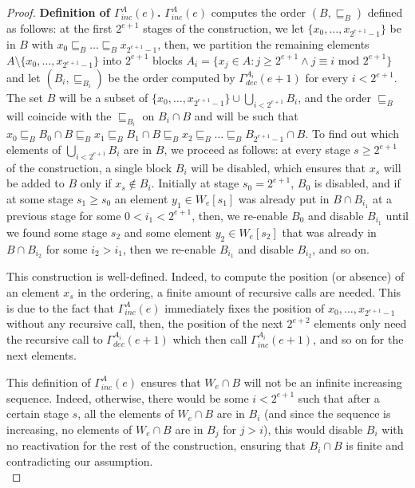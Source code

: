 \documentclass{article}
\numberwithin{theorem}{section}
\begin{document}
\begin{proof}
\textbf{Definition of $\Gamma^A_{inc}(e)$.}
$\Gamma^A_{inc}(e)$ computes the order $(B, \sqsubseteq_B)$ defined as follows: at the first $2^{e+1}$ stages of the construction, we let $\{x_0, \dots, x_{2^{e+1}-1}\}$ be in $B$ with $x_0 \sqsubseteq_B \dots \sqsubseteq_B x_{2^{e+1} - 1}$, then, we partition the remaining elements $A \setminus \{x_0, \dots, x_{2^{e+1} - 1}\}$ into $2^{e+1}$ blocks $A_i = \{x_j \in A : j \geq 2^{e+1} \wedge j \equiv i \mbox{ mod } 2^{e+1}\}$ and let $(B_i, \sqsubseteq_{B_i})$ be the order computed by $\Gamma^{A_i}_{dec}(e+1)$ for every $i < 2^{e+1}$. The set $B$ will be a subset of $\{x_0, \dots, x_{2^{e+1} - 1}\} \cup \bigcup_{i < 2^{e+1}} B_i$, and the order $\sqsubseteq_B$ will coincide with the $\sqsubseteq_{B_i}$ on $B_i \cap B$ and will be such that $x_0 \sqsubseteq_B B_0 \cap B \sqsubseteq_B x_1 \sqsubseteq_B B_1 \cap B \sqsubseteq_B x_2 \sqsubseteq_B \dots \sqsubseteq_B B_{2^{e+1} - 1} \cap B$. To find out which elements of $\bigcup_{i < 2^{e+1}} B_i$ are in $B$, we proceed as follows: at every stage $s \geq 2^{e+1}$ of the construction, a single block $B_i$ will be disabled, which ensures that $x_s$ will be added to $B$ only if $x_s \not\in B_i$. Initially at stage $s_0 = 2^{e+1}$, $B_0$ is disabled, and if at some stage $s_1 \geq s_0$ an element $y_1 \in W_e[s_1]$ was already put in $B \cap B_{i_1}$ at a previous stage for some $0 < i_1 < 2^{e+1}$, then, we re-enable $B_0$ and disable $B_{i_1}$ until we found some stage $s_2$ and some element $y_2 \in W_e[s_2]$ that was already in $B \cap B_{i_2}$ for some $i_2 > i_1$, then we re-enable $B_{i_1}$ and disable $B_{i_2}$, and so on. %

This construction is well-defined. Indeed, to compute the position (or absence) of an element $x_s$ in the ordering, a finite amount of recursive calls are needed. This is due to the fact that $\Gamma^A_{inc}(e)$ immediately fixes the position of $x_0, \dots, x_{2^{e+1} - 1}$ without any recursive call, then, the position of the next $2^{e+2}$ elements only need the recursive call to $\Gamma^{A_i}_{dec}(e+1)$ which then call $\Gamma^{A_i}_{inc}(e+1)$, and so on for the next elements. %

This definition of $\Gamma^A_{inc}(e)$ ensures that $W_e \cap B$ will not be an infinite increasing sequence. Indeed, otherwise, there would be some $i < 2^{e+1}$ such that after a certain stage $s$, all the elements of $W_e \cap B$ are in $B_i$ (and since the sequence is increasing, no elements of $W_e \cap B$ are in $B_j$ for $j > i$), this would disable $B_i$ with no reactivation for the rest of the construction, ensuring that $B_i \cap B$ is finite and contradicting our assumption. \\


\end{proof}
\end{document}
